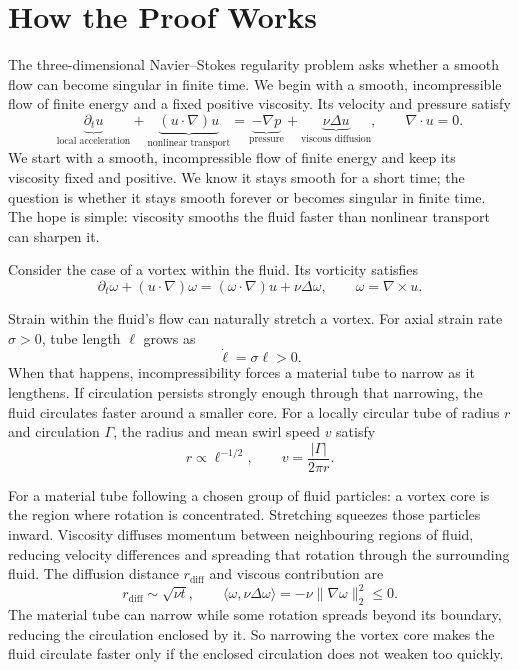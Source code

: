 \begingroup
\setlength{\parindent}{0pt}
\setlength{\parskip}{0.40\baselineskip}
\setlength{\abovedisplayskip}{6.5pt plus 1.5pt minus 1.5pt}
\setlength{\belowdisplayskip}{6.5pt plus 1.5pt minus 1.5pt}
\setlength{\jot}{5pt}

\section*{How the Proof Works}

The three-dimensional Navier--Stokes regularity problem asks whether a smooth
flow can become singular in finite time. We begin with a smooth,
incompressible flow of finite energy and a fixed positive viscosity. Its
velocity and pressure satisfy
\[
 \underbrace{\partial_tu}_{\text{local acceleration}}
 +\underbrace{(u\!\cdot\nabla)u}_{\text{nonlinear transport}}
 =\underbrace{-\nabla p}_{\text{pressure}}
 +\underbrace{\nu\Delta u}_{\text{viscous diffusion}},
 \qquad \nabla\!\cdot u=0.
\]
We start with a smooth, incompressible flow of finite energy and keep its
viscosity fixed and positive. We know it stays smooth for a short time; the
question is whether it stays smooth forever or becomes singular in finite
time. The hope is simple: viscosity smooths the fluid faster than nonlinear
transport can sharpen it.

Consider the case of a vortex within the fluid. Its vorticity satisfies
\[
 \partial_t\omega+(u\cdot\nabla)\omega
 =(\omega\cdot\nabla)u+\nu\Delta\omega,
 \qquad \omega=\nabla\times u.
\]

Strain within the fluid's flow can naturally stretch a vortex. For axial
strain rate \(\sigma>0\), tube length \(\ell\) grows as
\[
 \dot\ell=\sigma\ell>0.
\]
When that happens, incompressibility forces a material tube to narrow as it lengthens.
If circulation persists strongly enough through that narrowing, the fluid
circulates faster around a smaller core.
For a locally circular tube of radius \(r\) and circulation \(\Gamma\),
the radius and mean swirl speed \(v\) satisfy
\[
 r\propto\ell^{-1/2},
 \qquad v=\frac{|\Gamma|}{2\pi r}.
\]

For a material tube following a chosen group of fluid particles: a vortex
core is the region where rotation is concentrated. Stretching squeezes
those particles inward. Viscosity diffuses momentum between neighbouring
regions of fluid, reducing velocity differences and spreading that rotation
through the surrounding fluid.
The diffusion distance \(r_{\mathrm{diff}}\) and viscous contribution are
\[
 r_{\mathrm{diff}}\sim\sqrt{\nu t},
 \qquad
 \langle\omega,\nu\Delta\omega\rangle
 =-\nu\|\nabla\omega\|_2^2\le0.
\]
The material tube can narrow while some rotation spreads beyond its
boundary, reducing the circulation enclosed by it. So narrowing the vortex
core makes the fluid circulate faster only if the enclosed circulation does
not weaken too quickly.

